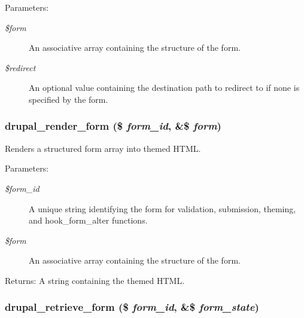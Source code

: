 \begin{Desc}
\item[Parameters:]
\begin{description}
\item[{\em \$form}]An associative array containing the structure of the form. \item[{\em \$redirect}]An optional value containing the destination path to redirect to if none is specified by the form. \end{description}
\end{Desc}
\hypertarget{group__form__api_gdd3fcf38a3d6fdcd11c58a6a48b4bd37}{
\subsubsection[{drupal\_\-render\_\-form}]{\setlength{\rightskip}{0pt plus 5cm}drupal\_\-render\_\-form (\$ {\em form\_\-id}, \/  \&\$ {\em form})}}
\label{group__form__api_gdd3fcf38a3d6fdcd11c58a6a48b4bd37}


Renders a structured form array into themed HTML.

\begin{Desc}
\item[Parameters:]
\begin{description}
\item[{\em \$form\_\-id}]A unique string identifying the form for validation, submission, theming, and hook\_\-form\_\-alter functions. \item[{\em \$form}]An associative array containing the structure of the form. \end{description}
\end{Desc}
\begin{Desc}
\item[Returns:]A string containing the themed HTML. \end{Desc}
\hypertarget{group__form__api_g82f16e1c86833aa88bf93adf93bae9bb}{
\subsubsection[{drupal\_\-retrieve\_\-form}]{\setlength{\rightskip}{0pt plus 5cm}drupal\_\-retrieve\_\-form (\$ {\em form\_\-id}, \/  \&\$ {\em form\_\-state})}}
\label{group__form__api_g82f16e1c86833aa88bf93adf93bae9bb}


